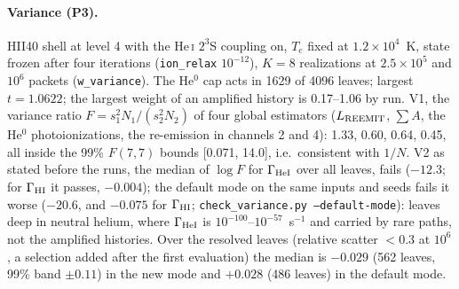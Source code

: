 \documentclass[english,a4paper]{my_memo}
\newcommand{\code}[1]{\texttt{#1}}
\begin{document}
\paragraph{Variance (P3).}  HII40 shell at level 4 with the He\,\textsc{i}
$2^3$S coupling on, $T_e$ fixed at $1.2\times10^4$~K, state frozen after four
iterations (\code{ion\_relax} $10^{-12}$), $K=8$ realizations at
$2.5\times10^5$ and $10^6$ packets (\code{w\_variance}).  The He$^0$ cap acts in
1629 of 4096 leaves; largest $t=1.0622$; the largest weight of an amplified
history is 0.17--1.06 by run.  V1, the variance ratio
$F=s_1^2N_1/(s_2^2N_2)$ of four global estimators ($L_{\rm REEMIT}$,
$\sum A$, the He$^0$ photoionizations, the re-emission in channels 2 and 4):
1.33, 0.60, 0.64, 0.45, all inside the 99\% $F(7,7)$ bounds [0.071, 14.0],
i.e.\ consistent with $1/N$.  V2 as stated before the runs, the median of
$\log F$ for $\Gamma_{\rm HeI}$ over all leaves, fails ($-12.3$; for
$\Gamma_{\rm HI}$ it passes, $-0.004$); the default mode on the same inputs and
seeds fails it worse ($-20.6$, and $-0.075$ for $\Gamma_{\rm HI}$;
\code{check\_variance.py --default-mode}): leaves deep in neutral helium, where
$\Gamma_{\rm HeI}$ is $10^{-100}$--$10^{-57}$~s$^{-1}$ and carried by rare
paths, not the amplified histories.  Over the resolved leaves (relative
scatter $<0.3$ at $10^6$, a selection added after the first evaluation) the
median is $-0.029$ (562 leaves, 99\% band $\pm0.11$) in the new mode and
$+0.028$ (486 leaves) in the default mode.



\end{document}
